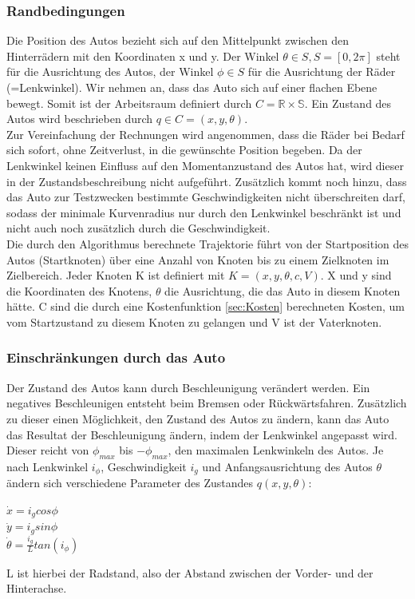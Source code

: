 \subsubsection{Randbedingungen}
Die Position des Autos bezieht sich auf den Mittelpunkt zwischen den Hinterrädern mit den Koordinaten x und y. Der Winkel $\theta \in S,  S=[0,2\pi]$ steht für die Ausrichtung des Autos, der Winkel $\phi \in S$ für die Ausrichtung der Räder (=Lenkwinkel). Wir nehmen an, dass das Auto sich auf einer flachen Ebene bewegt. Somit ist der Arbeitsraum definiert durch $C =  \mathbb{R \times S}$. Ein Zustand des Autos wird beschrieben durch $q \in C = (x,y,\theta)$.\\
Zur Vereinfachung der Rechnungen wird angenommen, dass die Räder bei Bedarf sich sofort, ohne Zeitverlust, in die gewünschte Position begeben. Da der Lenkwinkel keinen Einfluss auf den Momentanzustand des Autos hat, wird dieser in der Zustandsbeschreibung nicht aufgeführt. Zusätzlich kommt noch hinzu, dass das Auto zur Testzwecken bestimmte Geschwindigkeiten nicht überschreiten darf, sodass der minimale Kurvenradius nur durch den Lenkwinkel beschränkt ist und nicht auch noch zusätzlich durch die Geschwindigkeit. \\
Die durch den Algorithmus berechnete Trajektorie führt von der Startposition des Autos (Startknoten) über eine Anzahl von Knoten bis zu einem Zielknoten im Zielbereich. Jeder Knoten K ist definiert mit $K= (x,y,\theta, c, V)$. X und y sind die Koordinaten des Knotens, $\theta$ die Ausrichtung, die das Auto in diesem Knoten hätte. C sind die durch eine Kostenfunktion \ref{sec:Kosten} berechneten Kosten, um vom Startzustand zu diesem Knoten zu gelangen und V ist der Vaterknoten. 

\subsubsection{Einschränkungen durch das Auto}
Der Zustand des Autos kann durch Beschleunigung verändert werden. Ein negatives Beschleunigen entsteht beim Bremsen oder Rückwärtsfahren. Zusätzlich zu dieser einen Möglichkeit, den Zustand des Autos zu ändern, kann das Auto das Resultat der Beschleunigung ändern, indem der Lenkwinkel angepasst wird. Dieser reicht von $\phi_{max}$ bis $-\phi_{max}$, den maximalen Lenkwinkeln des Autos.
Je nach Lenkwinkel $i_{\phi}$, Geschwindigkeit $i_g$ und Anfangsausrichtung des Autos $\theta$ ändern sich verschiedene Parameter des Zustandes $q(x,y, \theta) $: \\
\begin{center}
$ \dot{x} = i_g cos \phi $ \\
$ \dot{y} = i_g sin \phi$ \\
$ \dot{{\theta}} = \frac{i_g}{L} tan (i_{\phi}) $
\end{center}
L ist hierbei der Radstand, also der Abstand zwischen der Vorder- und der Hinterachse. \\

